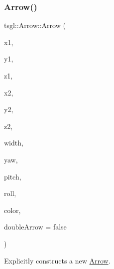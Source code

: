 \subsubsection{\texorpdfstring{Arrow()}{Arrow()}\hspace{0.1cm}{\footnotesize\ttfamily [1/4]}}
{\footnotesize\ttfamily tsgl\+::\+Arrow\+::\+Arrow (\begin{DoxyParamCaption}\item[{G\+Lfloat}]{x1,  }\item[{G\+Lfloat}]{y1,  }\item[{G\+Lfloat}]{z1,  }\item[{G\+Lfloat}]{x2,  }\item[{G\+Lfloat}]{y2,  }\item[{G\+Lfloat}]{z2,  }\item[{G\+Lfloat}]{width,  }\item[{float}]{yaw,  }\item[{float}]{pitch,  }\item[{float}]{roll,  }\item[{\hyperlink{structtsgl_1_1_color_float}{Color\+Float}}]{color,  }\item[{bool}]{double\+Arrow = {\ttfamily false} }\end{DoxyParamCaption})}



Explicitly constructs a new \hyperlink{classtsgl_1_1_arrow}{Arrow}. 


